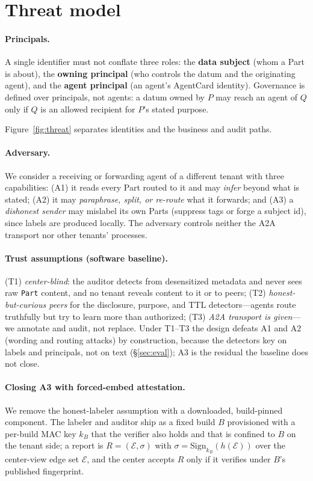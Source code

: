 \documentclass{article}
\begin{document}
\section{Threat model}\label{sec:threat}
\paragraph{Principals.} A single identifier must not conflate three roles: the
\textbf{data subject} (whom a Part is about), the \textbf{owning principal} (who
controls the datum and the originating agent), and the \textbf{agent principal} (an
agent's AgentCard identity). Governance is defined over principals, not agents: a
datum owned by $P$ may reach an agent of $Q$ only if $Q$ is an allowed recipient for
$P$'s stated purpose.

Figure~\ref{fig:threat} separates identities and the business and audit paths.


\paragraph{Adversary.} We consider a receiving or forwarding agent of a different
tenant with three capabilities: (A1) it reads every Part routed to it and may
\emph{infer} beyond what is stated; (A2) it may \emph{paraphrase, split, or re-route}
what it forwards; and (A3) a \emph{dishonest sender} may mislabel its own Parts
(suppress tags or forge a subject id), since labels are produced locally. The
adversary controls neither the A2A transport nor other tenants' processes.

\paragraph{Trust assumptions (software baseline).} (T1) \emph{center-blind}: the
auditor detects from desensitized metadata and never sees raw \texttt{Part} content,
and no tenant reveals content to it or to peers; (T2) \emph{honest-but-curious peers}
for the disclosure, purpose, and TTL detectors---agents route truthfully but try to
learn more than authorized; (T3) \emph{A2A transport is given}---we annotate and
audit, not replace. Under T1--T3 the design defeats A1 and A2 (wording and routing
attacks) by construction, because the detectors key on labels and principals, not on
text (\S\ref{sec:eval}); A3 is the residual the baseline does not close.

\paragraph{Closing A3 with forced-embed attestation.} We remove the honest-labeler
assumption with a downloaded, build-pinned component. The labeler and auditor ship as a fixed build $B$ provisioned with a per-build MAC key $k_B$ that the verifier also holds and that is confined to $B$ on the tenant side; a report is
$R=(\mathcal{E},\sigma)$ with $\sigma=\mathrm{Sign}_{k_B}(h(\mathcal{E}))$ over the
center-view edge set $\mathcal{E}$, and the center accepts $R$ only if it verifies
under $B$'s published fingerprint.
\end{document}
